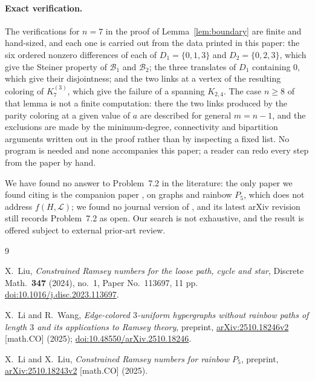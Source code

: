 \documentclass[11pt]{amsart}
\newcommand{\Lpath}{\mathcal L}
\begin{document}
\paragraph{Exact verification.}
The verifications for $n=7$ in the proof of Lemma~\ref{lem:boundary} are
finite and hand-sized, and each one is carried out from the data printed in
this paper: the six ordered nonzero differences of
each of $D_1=\{0,1,3\}$ and $D_2=\{0,2,3\}$, which give the Steiner property
of $\mathcal B_1$ and $\mathcal B_2$; the three translates of $D_1$ containing
$0$, which give their disjointness; and the two links at a vertex of the
resulting coloring of $K_7^{(3)}$, which give the failure of a spanning
$K_{2,4}$. The case $n\ge8$ of that lemma is not a finite computation: there
the two links produced by the parity coloring at a given value of $a$ are
described for general $m=n-1$, and the exclusions are made by the
minimum-degree, connectivity and bipartition arguments written out in the
proof rather than by inspecting a fixed list. No
program is needed and none accompanies this paper; a reader can redo every
step from the paper by hand.

We have found no answer to Problem~7.2 in
the literature: the only paper we found citing \cite{LiWang} is the
companion paper \cite{LiLiu}, on graphs and rainbow $P_5$, which does not
address $f(H,\Lpath)$; we found no journal version of \cite{LiWang}, and
its latest arXiv revision still records Problem~7.2 as open. Our search
is not exhaustive, and the result is offered subject to external
prior-art review.

\begin{thebibliography}{9}

X.~Liu,
\emph{Constrained Ramsey numbers for the loose path, cycle and star},
Discrete Math.\ \textbf{347} (2024), no.~1, Paper No.~113697, 11 pp.
\href{https://doi.org/10.1016/j.disc.2023.113697}
{doi:10.1016/j.disc.2023.113697}.

X.~Li and R.~Wang,
\emph{Edge-colored $3$-uniform hypergraphs without rainbow paths of
length $3$ and its applications to Ramsey theory},
preprint, \href{https://arxiv.org/abs/2510.18246}{arXiv:2510.18246v2}
[math.CO] (2025);
\href{https://doi.org/10.48550/arXiv.2510.18246}
{doi:10.48550/arXiv.2510.18246}.

X.~Li and X.~Liu,
\emph{Constrained Ramsey numbers for rainbow $P_5$},
preprint, \href{https://arxiv.org/abs/2510.18243}{arXiv:2510.18243v2}
[math.CO] (2025).

\end{thebibliography}
\end{document}
